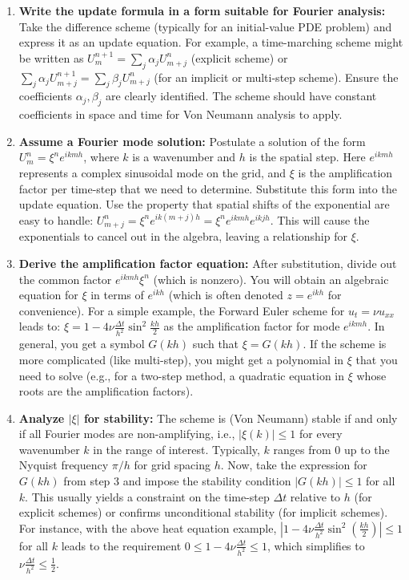 \documentclass[a4paper,11pt]{report}
\begin{document}
\begin{enumerate}
    \item \textbf{Write the update formula in a form suitable for Fourier analysis:} Take the difference scheme (typically for an initial-value PDE problem) and express it as an update equation. For example, a time-marching scheme might be written as $U^{n+1}_m = \sum_j \alpha_j U^n_{m+j}$ (explicit scheme) or $\sum_j \alpha_j U^{n+1}_{m+j} = \sum_j \beta_j U^n_{m+j}$ (for an implicit or multi-step scheme). Ensure the coefficients $\alpha_j, \beta_j$ are clearly identified. The scheme should have constant coefficients in space and time for Von Neumann analysis to apply.

    \item \textbf{Assume a Fourier mode solution:} Postulate a solution of the form $U^n_m = \xi^n e^{ikmh}$, where $k$ is a wavenumber and $h$ is the spatial step. Here $e^{ikmh}$ represents a complex sinusoidal mode on the grid, and $\xi$ is the amplification factor per time-step that we need to determine. Substitute this form into the update equation. Use the property that spatial shifts of the exponential are easy to handle: $U^n_{m+j} = \xi^n e^{ik(m+j)h} = \xi^n e^{ikmh} e^{ikjh}$. This will cause the exponentials to cancel out in the algebra, leaving a relationship for $\xi$.

    \item \textbf{Derive the amplification factor equation:} After substitution, divide out the common factor $e^{ikmh}\xi^n$ (which is nonzero). You will obtain an algebraic equation for $\xi$ in terms of $e^{ikh}$ (which is often denoted $z = e^{ikh}$ for convenience). For a simple example, the Forward Euler scheme for $u_t = \nu u_{xx}$ leads to: $\xi = 1 - 4\nu \frac{\Delta t}{h^2}\sin^2\frac{kh}{2}$ as the amplification factor for mode $e^{ikmh}$. In general, you get a symbol $G(kh)$ such that $\xi = G(kh)$. If the scheme is more complicated (like multi-step), you might get a polynomial in $\xi$ that you need to solve (e.g., for a two-step method, a quadratic equation in $\xi$ whose roots are the amplification factors).

    \item \textbf{Analyze $|\xi|$ for stability:} The scheme is (Von Neumann) stable if and only if all Fourier modes are non-amplifying, i.e., $|\xi(k)| \le 1$ for every wavenumber $k$ in the range of interest. Typically, $k$ ranges from $0$ up to the Nyquist frequency $\pi/h$ for grid spacing $h$. Now, take the expression for $G(kh)$ from step 3 and impose the stability condition $|G(kh)| \le 1$ for all $k$. This usually yields a constraint on the time-step $\Delta t$ relative to $h$ (for explicit schemes) or confirms unconditional stability (for implicit schemes). For instance, with the above heat equation example, $|1 - 4\nu \frac{\Delta t}{h^2}\sin^2(\frac{kh}{2})| \le 1$ for all $k$ leads to the requirement $0 \le 1 - 4\nu \frac{\Delta t}{h^2} \le 1$, which simplifies to $\nu \frac{\Delta t}{h^2} \le \frac{1}{2}$.


\end{enumerate}
\end{document}
